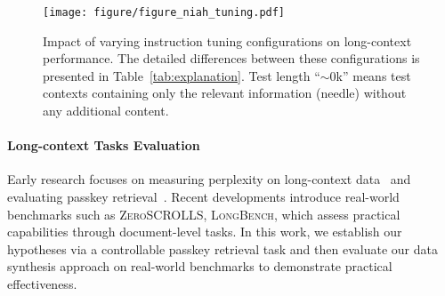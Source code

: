 \begin{figure*}[ht!]
    \centering
    \texttt{[image: figure/figure\_niah\_tuning.pdf]}
    \caption{Impact of varying instruction tuning configurations on long-context performance. The detailed differences between these configurations is presented in Table~\ref{tab:explanation}. Test length ``$\sim$0k''  means test contexts containing only the relevant information (needle) without any additional content.}
   \label{fig:niah}
\end{figure*}

\noindent\paragraph{Long-context Tasks Evaluation}
Early research focuses on measuring perplexity on long-context data~\cite{chen2023extending,peng2024yarn} and evaluating passkey retrieval~\cite{fu2024data}.
Recent developments introduce real-world benchmarks such as \textsc{ZeroSCROLLS}, \textsc{LongBench}, which assess practical capabilities through document-level tasks.
In this work, we establish our hypotheses via a controllable passkey retrieval task and then evaluate our data synthesis approach on real-world benchmarks to demonstrate practical effectiveness.